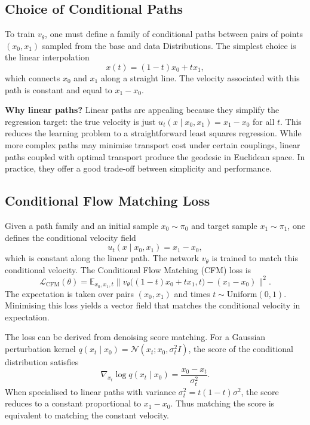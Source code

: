 \subsection{Choice of Conditional Paths}

To train $v_\theta$, one must define a family of conditional paths
between pairs of points $(x_0, x_1)$ sampled from the base and data
Distributions.  The simplest choice is the linear interpolation
\begin{equation}
  x(t) = (1-t)x_0 + t x_1,
\end{equation}
which connects $x_0$ and $x_1$ along a straight line.  The velocity
associated with this path is constant and equal to $x_1 - x_0$.

\begin{solutionbox}
  \textbf{Why linear paths?}  Linear paths are appealing because
  they simplify the regression target: the true velocity is just
  $u_t(x\mid x_0,x_1) = x_1 - x_0$ for all $t$.  This reduces the
  learning problem to a straightforward least squares regression.
  While more complex paths may minimise transport cost under certain
  couplings, linear paths coupled with optimal transport produce the
  geodesic in Euclidean space.  In practice, they offer a good
  trade-off between simplicity and performance.
\end{solutionbox}

\subsection{Conditional Flow Matching Loss}

Given a path family and an initial sample $x_0\sim\pi_0$ and target
sample $x_1\sim\pi_1$, one defines the conditional velocity field
\begin{equation}
  u_t(x\mid x_0,x_1) = x_1 - x_0,
\end{equation}
which is constant along the linear path.  The network $v_\theta$ is
trained to match this conditional velocity.  The Conditional Flow
Matching (CFM) loss is
\begin{equation}
  \mathcal{L}_{\text{CFM}}(\theta) = \mathbb{E}_{x_0,x_1,t}
  \bigl\|v_\theta\bigl((1-t)x_0 + t x_1, t\bigr) - (x_1 - x_0)\bigr\|^2.
\end{equation}
The expectation is taken over pairs $(x_0,x_1)$ and times
$t\sim\mathrm{Uniform}(0,1)$.  Minimising this loss yields a vector
field that matches the conditional velocity in expectation.

\begin{solutionbox}
  The loss can be derived from denoising score matching.  For a
  Gaussian perturbation kernel $q(x_t\mid x_0) = \mathcal{N}(x_t;
  x_0, \sigma_t^2 I)$, the score of the conditional distribution
  satisfies
  \begin{equation}
    \nabla_{x_t} \log q(x_t\mid x_0) = \frac{x_0 - x_t}{\sigma_t^2}.
  \end{equation}
  When specialised to linear paths with variance $\sigma_t^2 = t(1-t)\sigma^2$,
  the score reduces to a constant proportional to $x_1 - x_0$.  Thus
  matching the score is equivalent to matching the constant
  velocity.
\end{solutionbox}

